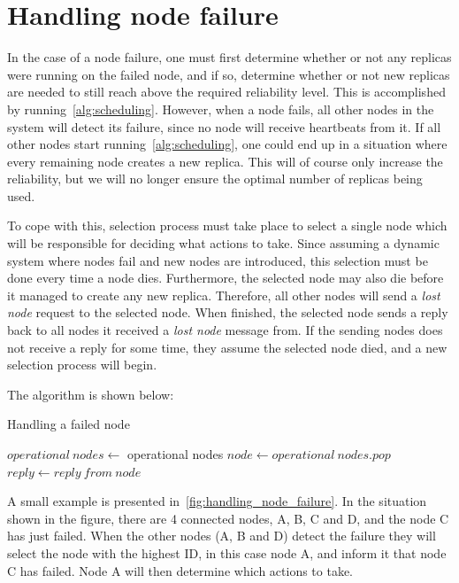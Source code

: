 \documentclass{cslthse-msc}
\begin{document}
\section{Handling node failure} \label{sec:design_handling_failure}
In the case of a node failure, one must first determine whether or not any replicas were running on the failed node, and if so, determine whether or not new replicas are needed to still reach above the required reliability level. This is accomplished by running~\cref{alg:scheduling}. However, when a node fails, all other nodes in the system will detect its failure, since no node will receive heartbeats from it. If all other nodes start running~\cref{alg:scheduling}, one could end up in a situation where every remaining node creates a new replica. This will of course only increase the reliability, but we will no longer ensure the optimal number of replicas being used. 

To cope with this, selection process must take place to select a single node which will be responsible for deciding what actions to take. Since assuming a dynamic system where nodes fail and new nodes are introduced, this selection must be done every time a node dies. Furthermore, the selected node may also die before it managed to create any new replica. Therefore, all other nodes will send a \emph{lost node} request to the selected node. When finished, the selected node sends a reply back to all nodes it received a \emph{lost node} message from. If the sending nodes does not receive a reply for some time, they assume the selected node died, and a new selection process will begin.

The algorithm is shown below: %

\begin{algorithm}\label{alg:node_failure}
	\caption{Handling a failed node}
	\begin{algorithmic}[1]
	\State $operational\ nodes\gets $ operational nodes
	\State
	\Do
		\State $node\gets operational\ nodes.pop$
		\State
		\State $reply\gets reply\ from\ node$
	\end{algorithmic}
\end{algorithm}

A small example is presented in~\cref{fig:handling_node_failure}. In the situation shown in the figure, there are 4 connected nodes, A, B, C and D, and the node C has just failed. When the other nodes (A, B and D) detect the failure they will select the node with the highest ID, in this case node A, and inform it that node C has failed. Node A will then determine which actions to take.
\end{document}
